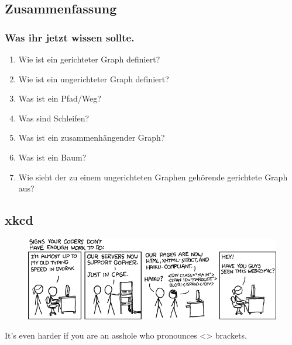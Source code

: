 \documentclass{beamer}
\begin{document}
\subsection{Zusammenfassung}
\begin{frame}
  \frametitle{Was ihr jetzt wissen sollte.}
  \begin{enumerate}
    \item Wie ist ein gerichteter Graph definiert?
    \item Wie ist ein ungerichteter Graph definiert?
    \item Was ist ein Pfad/Weg?
    \item Was sind Schleifen?
    \item Was ist ein zusammenhängender Graph?
    \item Was ist ein Baum?
    \item Wie sieht der zu einem ungerichteten Graphen gehörende gerichtete Graph aus?
  \end{enumerate}
\end{frame}

\subsection{xkcd}
\begin{frame}[plain]
  \begin{figure}
    \begin{center}
      \includegraphics[width=320pt]{not_enough_work}
    \end{center}
  \end{figure}
  {\tiny It's even harder if you are an asshole who pronounces <> brackets.}
\end{frame}
\end{document}
